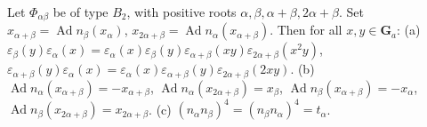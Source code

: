 Let $\Phi_{\alpha\beta}$ be of type $B_2$, with positive roots $\alpha, \beta, \alpha+\beta, 2\alpha+\beta$. Set $x_{\alpha+\beta} = \operatorname{Ad} n_{\beta}(x_{\alpha})$, $x_{2\alpha+\beta} = \operatorname{Ad} n_{\alpha}(x_{\alpha+\beta})$. Then for all $x, y \in \mathbf{G}_a$:
(a) $\varepsilon_{\beta}(y)\varepsilon_{\alpha}(x) = \varepsilon_{\alpha}(x)\varepsilon_{\beta}(y)\varepsilon_{\alpha+\beta}(xy)\varepsilon_{2\alpha+\beta}(x^2 y)$,
  $\varepsilon_{\alpha+\beta}(y)\varepsilon_{\alpha}(x) = \varepsilon_{\alpha}(x)\varepsilon_{\alpha+\beta}(y)\varepsilon_{2\alpha+\beta}(2xy)$.
(b) $\operatorname{Ad} n_{\alpha}(x_{\alpha+\beta}) = -x_{\alpha+\beta}$, $\operatorname{Ad} n_{\alpha}(x_{2\alpha+\beta}) = x_{\beta}$,
  $\operatorname{Ad} n_{\beta}(x_{\alpha+\beta}) = -x_{\alpha}$, $\operatorname{Ad} n_{\beta}(x_{2\alpha+\beta}) = x_{2\alpha+\beta}$.
(c) $(n_{\alpha}n_{\beta})^{4} = (n_{\beta}n_{\alpha})^{4} = t_{\alpha}$.
